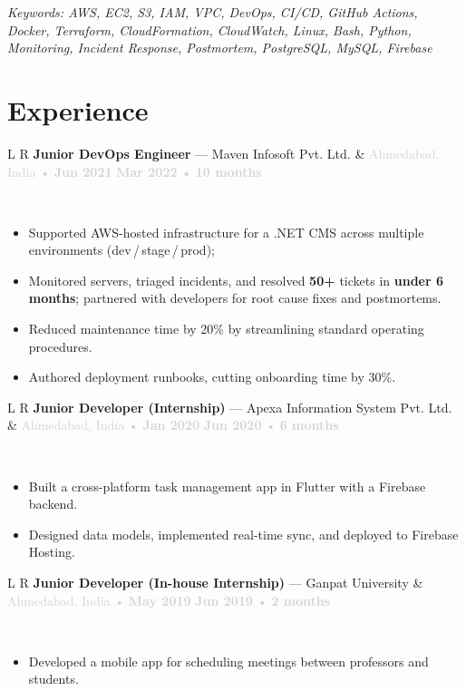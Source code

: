 \documentclass[11pt,a4paper]{article}
\newcommand{\dotnet}{\mbox{.NET}}
\newcommand{\xpheader}[5]{%
  {\small\noindent\begin{tabularx}{\textwidth}{L R}
    \textbf{#1} — #2 & \textcolor{lightgray}{#3 • #4 • #5}\\
  \end{tabularx}}\\[-4pt]}
\newenvironment{tightitemize}{\vspace*{-\parskip}\begin{itemize}[leftmargin=*, topsep=0pt, itemsep=0pt, parsep=0pt, partopsep=0pt]\RaggedRight}{\end{itemize}}
\begin{document}
{\footnotesize\textit{Keywords: AWS, EC2, S3, IAM, VPC, DevOps, CI/CD, GitHub Actions, Docker, Terraform, CloudFormation, CloudWatch, Linux, Bash, Python, Monitoring, Incident Response, Postmortem, PostgreSQL, MySQL, Firebase}}

\section*{Experience}

\xpheader{\textbf{Junior DevOps Engineer}}{Maven\- Infosoft\- Pvt.\- Ltd.}{Ahmedabad, India}{\textbf{Jun 2021} \textendash{} \textbf{Mar 2022}}{\textbf{10 months}}
\begin{tightitemize}
    \item Supported AWS-hosted infrastructure for a \dotnet{} CMS across multiple environments (dev\,/\,stage\,/\,prod);
    \item Monitored servers, triaged incidents, and resolved \textbf{50+} tickets in \textbf{under 6 months}; partnered with developers for root cause fixes and postmortems.
    \item Reduced maintenance time by 20\% by streamlining standard operating procedures.
    \item Authored deployment runbooks, cutting onboarding time by 30\%.
\end{tightitemize}
\vspace{2pt}

\xpheader{\textbf{Junior Developer (Internship)}}{Apexa\- Information\- System\- Pvt.\- Ltd.}{Ahmedabad, India}{\textbf{Jan 2020} \textendash{} \textbf{Jun 2020}}{\textbf{6 months}}
\begin{tightitemize}
    \item Built a cross-platform task management app in Flutter with a Firebase backend.
    \item Designed data models, implemented real-time sync, and deployed to Firebase Hosting.
\end{tightitemize}
\vspace{2pt}

\xpheader{\textbf{Junior Developer (In-house Internship)}}{Ganpat University}{Ahmedabad, India}{\textbf{May 2019} \textendash{} \textbf{Jun 2019}}{\textbf{2 months}}
\begin{tightitemize}
    \item Developed a mobile app for scheduling meetings between professors and students.
\end{tightitemize}
\end{document}
